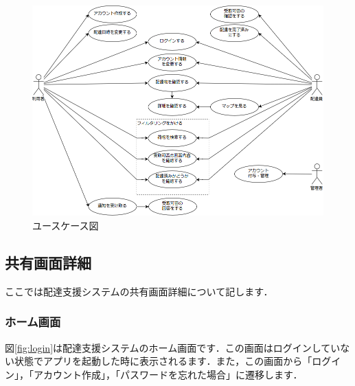 \documentclass[a4j,titlepage]{jarticle}
\begin{document}
\begin{figure}[H]
 \begin{center}
  \includegraphics[width=150mm]{use_case.png}
	\caption{ユースケース図}
	\label{fig:use_case}
 \end{center}

\end{figure}

\newpage
\subsection{共有画面詳細}
ここでは配達支援システムの共有画面詳細について記します．

\subsubsection{ホーム画面}
図\ref{fig:login}は配達支援システムのホーム画面です．この画面はログインしていない状態でアプリを起動した時に表示されるます．また，この画面から「ログイン」，「アカウント作成」，「パスワードを忘れた場合」に遷移します．
\end{document}
